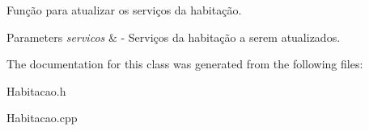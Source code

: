 Função para atualizar os serviços da habitação. 


\begin{DoxyParams}{Parameters}
{\em servicos} & -\/ Serviços da habitação a serem atualizados. \\
\hline
\end{DoxyParams}


The documentation for this class was generated from the following files\+:\begin{DoxyCompactItemize}
\item 
Habitacao.\+h\item 
Habitacao.\+cpp\end{DoxyCompactItemize}
